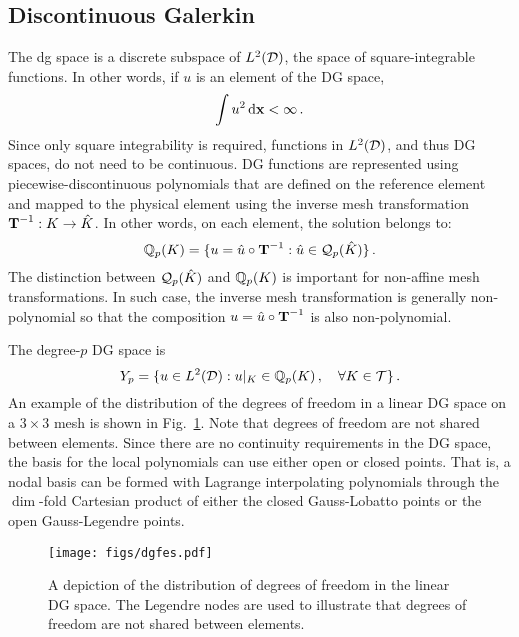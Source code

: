 \documentclass[../doc.tex]{subfiles}
\begin{document}
\subsection{Discontinuous Galerkin} \label{fem_sec:dg}
The \gls{dg} space is a discrete subspace of $L^2(\mathcal{D})$, the space of square-integrable functions. In other words, if $u$ is an element of the DG space, 
	\begin{equation}
		\int u^2 \mathop{}\!\mathrm{d} \boldsymbol{\mathrm{x}} < \infty \,. 
	\end{equation}
Since only square integrability is required, functions in $L^2(\mathcal{D})$, and thus DG spaces, do not need to be continuous. DG functions are represented using piecewise-discontinuous polynomials that are defined on the reference element and mapped to the physical element using the inverse mesh transformation $\boldsymbol{\mathrm{T}}^{-1}: K \rightarrow \hat{K}$. In other words, on each element, the solution belongs to: 
	\begin{equation}
		\mathbb{Q}_{p}(K) = \{ u = \hat{u} \circ \boldsymbol{\mathrm{T}}^{-1} : \hat{u} \in \mathcal{Q}_p(\hat{K}) \}\,. 
	\end{equation}
The distinction between $\mathcal{Q}_{p}(\hat{K})$ and $\mathbb{Q}_{p}(K)$ is important for non-affine mesh transformations. In such case, the inverse mesh transformation is generally non-polynomial so that the composition $u = \hat{u}\circ\boldsymbol{\mathrm{T}}^{-1}$ is also non-polynomial. 

The degree-$p$ DG space is 
	\begin{equation}
		Y_p = \{ u \in L^2(\mathcal{D}) : u|_{K} \in \mathbb{Q}_{p}(K) \,, \quad \forall K \in \mathcal{T} \} \,. 
	\end{equation}
An example of the distribution of the degrees of freedom in a linear DG space on a $3\times 3$ mesh is shown in Fig.~\ref{fem:dgfes}. Note that degrees of freedom are not shared between elements. Since there are no continuity requirements in the DG space, the basis for the local polynomials can use either open or closed points. That is, a nodal basis can be formed with Lagrange interpolating polynomials through the $\dim$-fold Cartesian product of either the closed Gauss-Lobatto points or the open Gauss-Legendre points. 
\begin{figure}
\centering
\texttt{[image: figs/dgfes.pdf]}
\caption{A depiction of the distribution of degrees of freedom in the linear DG space. The Legendre nodes are used to illustrate that degrees of freedom are not shared between elements. }
\label{fem:dgfes}
\end{figure}
\end{document}
